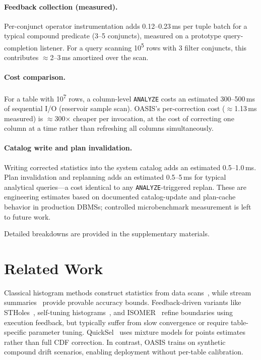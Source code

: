 \documentclass[runningheads]{llncs}
\begin{document}
\paragraph{Feedback collection (measured).}
Per-conjunct operator instrumentation adds 0.12--0.23\,ms per tuple batch for a typical compound predicate (3--5 conjuncts), measured on a prototype query-completion listener. For a query scanning 10\textsuperscript{5} rows with 3 filter conjuncts, this contributes $\approx$2--3\,ms amortized over the scan.

\paragraph{Cost comparison.}
For a table with 10\textsuperscript{7} rows, a column-level \texttt{ANALYZE} costs an estimated 300--500\,ms of sequential I/O (reservoir sample scan). OASIS's per-correction cost ($\approx$1.13\,ms measured) is $\approx$300$\times$ cheaper per invocation, at the cost of correcting one column at a time rather than refreshing all columns simultaneously.

\paragraph{Catalog write and plan invalidation.}
Writing corrected statistics into the system catalog adds an estimated 0.5--1.0\,ms. Plan invalidation and replanning adds an estimated 0.5--5\,ms for typical analytical queries---a cost identical to any \texttt{ANALYZE}-triggered replan. These are engineering estimates based on documented catalog-update and plan-cache behavior in production DBMSs; controlled microbenchmark measurement is left to future work.

Detailed breakdowns are provided in the supplementary materials.


\section{Related Work}
\label{sec:related}
Classical histogram methods construct statistics from data scans~\cite{ioannidis1993histogram,poosala1997selectivity}, while stream summaries~\cite{ivkin2019kll,agarwal2013mergeable} provide provable accuracy bounds. Feedback-driven variants like STHoles~\cite{bruno2001stholes}, self-tuning histograms~\cite{aboulnaga1999self}, and ISOMER~\cite{markl2007consistent} refine boundaries using execution feedback, but typically suffer from slow convergence or require table-specific parameter tuning. QuickSel~\cite{park2020quicksel} uses mixture models for points estimates rather than full CDF correction. In contrast, OASIS trains on synthetic compound drift scenarios, enabling deployment without per-table calibration.
\end{document}
